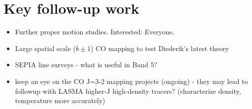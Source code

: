 \section{Key follow-up work}
\begin{itemize}
\item Further proper motion studies.  Interested: Everyone.
\item Large spatial scale ($b\pm1$\deg) CO mapping to test Diederik's latest theory
\item SEPIA line surveys - what is useful in Band 5?
\item keep an eye on the CO J=3-2 mapping projects (ongoing) - they may lead to  followup with LASMA higher-J high-density tracers?  (characterize density, temperature more accurately)
\end{itemize}